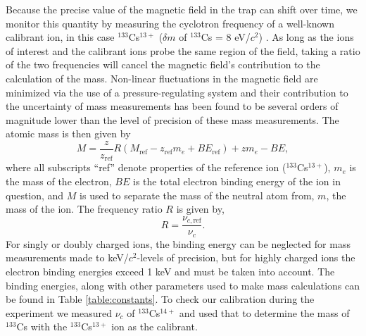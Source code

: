 \documentclass[twocolumn,prc,showpacs,preprintnumbers,amsmath,amssymb,superscriptaddress,nofootinbib,aps,10pt]{revtex4-1}
\begin{document}
Because the precise value of the magnetic field in the trap can shift over time, we monitor this quantity by measuring the cyclotron frequency of a well-known calibrant ion, in this case $^{133}$Cs$^{13+}$ ($\delta m$ of $^{133}$Cs = 8 eV/$c^2$) \cite{Audi2012,Wang2012}. As long as the ions of interest and the calibrant ions probe the same region of the field, taking a ratio of the two frequencies will cancel the magnetic field's contribution to the calculation of the mass. Non-linear fluctuations in the magnetic field are minimized via the use of a pressure-regulating system and their contribution to the uncertainty of mass measurements has been found to be several orders of magnitude lower than the level of precision of these mass measurements. The atomic mass is then given by
\begin{equation}
M = \frac{z}{z_{\mathrm{ref}}}R \left(M_{\mathrm{ref}} - z_{\mathrm{ref}}m_e + BE_{\mathrm{ref}} \right) + zm_e - BE,
\end{equation}
where all subscripts ``ref'' denote properties of the reference ion ($^{133}$Cs$^{13+}$), $m_e$ is the mass of the electron, $BE$ is the total electron binding energy of the ion in question, and $M$ is used to separate the mass of the neutral atom from, $m$, the mass of the ion. The frequency ratio $R$ is given by,
\begin{equation}
R = \frac{\nu_{c,\mathrm{ref}}}{\nu_c}.
\end{equation}
For singly or doubly charged ions, the binding energy can be neglected for mass measurements made to keV/$c^2$-levels of precision, but for highly charged ions the electron binding energies exceed 1 keV and must be taken into account. The binding energies, along with other parameters used to make mass calculations can be found in Table \ref{table:constants}. To check our calibration during the experiment we measured $\nu_c$ of $^{133}$Cs$^{14+}$ and used that to determine the mass of $^{133}$Cs with the $^{133}$Cs$^{13+}$ ion as the calibrant.
\end{document}
